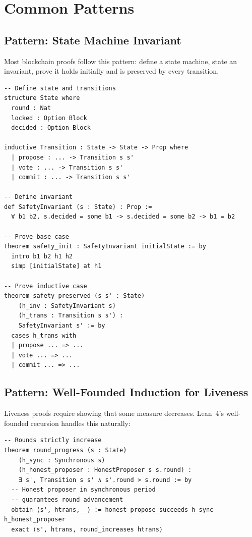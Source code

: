 \section{Common Patterns}


\subsection{Pattern: State Machine Invariant}

Most blockchain proofs follow this pattern: define a state machine, state an invariant,
prove it holds initially and is preserved by every transition.

\begin{lstlisting}[language=Lean,caption={State machine invariant pattern}]
-- Define state and transitions
structure State where
  round : Nat
  locked : Option Block
  decided : Option Block

inductive Transition : State -> State -> Prop where
  | propose : ... -> Transition s s'
  | vote : ... -> Transition s s'
  | commit : ... -> Transition s s'

-- Define invariant
def SafetyInvariant (s : State) : Prop :=
  ∀ b1 b2, s.decided = some b1 -> s.decided = some b2 -> b1 = b2

-- Prove base case
theorem safety_init : SafetyInvariant initialState := by
  intro b1 b2 h1 h2
  simp [initialState] at h1

-- Prove inductive case
theorem safety_preserved (s s' : State)
    (h_inv : SafetyInvariant s)
    (h_trans : Transition s s') :
    SafetyInvariant s' := by
  cases h_trans with
  | propose ... => ...
  | vote ... => ...
  | commit ... => ...
\end{lstlisting}

\subsection{Pattern: Well-Founded Induction for Liveness}

Liveness proofs require showing that some measure decreases. Lean~4's well-founded
recursion handles this naturally:

\begin{lstlisting}[language=Lean,caption={Well-founded liveness argument}]
-- Rounds strictly increase
theorem round_progress (s : State)
    (h_sync : Synchronous s)
    (h_honest_proposer : HonestProposer s s.round) :
    ∃ s', Transition s s' ∧ s'.round > s.round := by
  -- Honest proposer in synchronous period
  -- guarantees round advancement
  obtain ⟨s', htrans, _⟩ := honest_propose_succeeds h_sync h_honest_proposer
  exact ⟨s', htrans, round_increases htrans⟩
\end{lstlisting}

